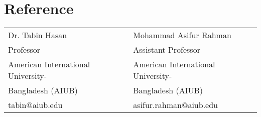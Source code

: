 \documentclass[]{deedy-resume-openfont}
\begin{document}
\begin{minipage}[t]{0.66\textwidth}

\section{Reference} 

\begin{tabular}{ll}
Dr. Tabin Hasan    & Mohammad Asifur Rahman\\
Professor   & Assistant Professor\\
American International University- & American International University-\\
Bangladesh (AIUB)& Bangladesh (AIUB)\\
tabin@aiub.edu   & asifur.rahman@aiub.edu\\
\end{tabular}
\sectionsep


%

\end{minipage} 
\end{document}
